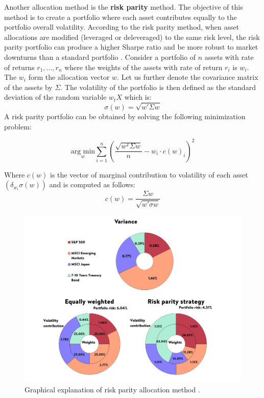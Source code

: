 \hfill \break

Another allocation method is the \textbf{risk parity} method. The objective of this method is to create a portfolio where each asset contributes equally to the portfolio overall volatility. According to the risk parity method, when asset allocations are modified (leveraged or deleveraged) to the same risk level, the risk parity portfolio can produce a higher Sharpe ratio and be more robust to market downturns than a standard portfolio \cite{teiletche2008}. 
Consider a portfolio of $n$ assets with rate of returns $r_1,...,r_n$ where the weights of the assets with rate of return $r_i$ is $w_i$. The $w_i$ form the allocation vector $w$. Let us further denote the covariance matrix of the assets by $\Sigma$. The volatility of the portfolio is then defined as the standard deviation of the random variable $w_t X$ which is:
$$ \sigma(w) = \sqrt{w' \Sigma w} $$
A risk parity portfolio can be obtained by solving the following minimization problem: 

$$ \underset{w}{\text{arg min}} \sum\limits_{i=1}^n \left( \frac{\sqrt{w^T \Sigma w}}{n} - w_i \cdot c(w)_i\right)^2 $$

Where $c(w)$ is the vector of marginal contribution to volatility of each asset $(\delta_{w_i} \sigma(w))$ and is computed as follows:
$$ c(w) = \frac{\Sigma w}{\sqrt{w' \sigma w}} $$

\begin{figure}[h]
    \centering
    \includegraphics[width=\textwidth]{cap2/Risk-parity-Explanation.png}
    \caption[Risk parity allocation method]{Graphical explanation of risk parity allocation method \cite{fuertes2017}.}
    \label{risk_parity}
\end{figure}


